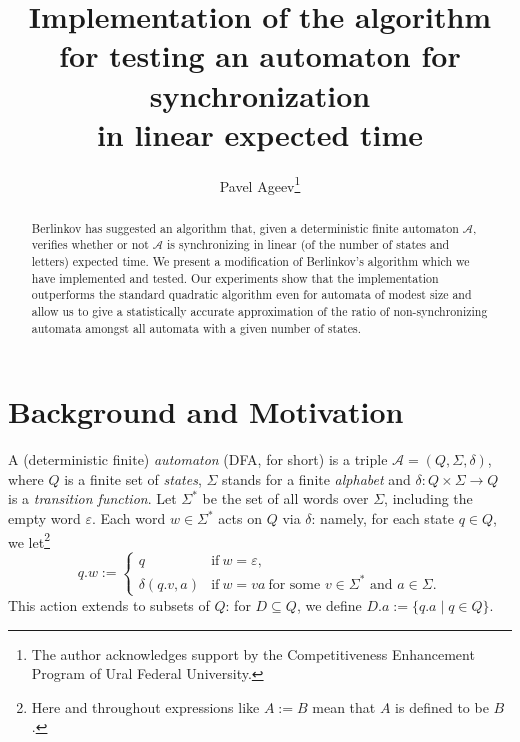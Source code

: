 \documentclass{llncs}
\begin{document}
%
\mainmatter          %
%

\title{Implementation of the algorithm \\ for testing an automaton for synchronization \\ in linear expected time}

\author{Pavel Ageev\thanks{The author acknowledges support by the Competitiveness Enhancement Program of Ural Federal University.}}


\maketitle
\begin{abstract}
Berlinkov has suggested an algorithm that, given a deterministic finite automaton $\mathcal{A}$, verifies whether or not $\mathcal{A}$ is synchronizing in linear (of the number of states and letters) expected time. We present a modification of Berlinkov's algorithm which we have implemented and tested. Our experiments show that the implementation outperforms the standard quadratic algorithm even for automata of modest size and allow us to give a statistically accurate approximation of the ratio of non-synchronizing automata amongst all automata with a given number of states.
\end{abstract}

\section{Background and Motivation}

A (deterministic finite) \emph{automaton} (DFA, for short) is a triple $\mathcal{A}=(Q, \Sigma, \delta)$, where $Q$ is a finite set of \emph{states}, $\Sigma$ stands for a finite \emph{alphabet} and $\delta\colon Q\times\Sigma \rightarrow Q$ is a \emph{transition function}. Let $\Sigma^*$ be the set of all words over $\Sigma$, including the empty word $\varepsilon$. Each word $w\in\Sigma^*$ acts on $Q$ via $\delta$: namely, for each state $q\in Q$, we let\footnote{Here and throughout expressions like $A := B$ mean that $A$ is defined to be $B$.}
\[
q.w:=\begin{cases}
q &\text{if}\ w=\varepsilon,\\
\delta(q.v,a) &\text{if}\ w=va\ \text{for some $v\in\Sigma^*$ and $a\in\Sigma$}.
\end{cases}
\]
This action extends to subsets of $Q$: for $D\subseteq Q$, we define $D.a:=\{q.a \mid q \in Q\}$.
\end{document}
